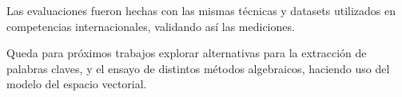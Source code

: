 \documentclass{llncs}
\begin{document}
Las evaluaciones fueron hechas con las mismas técnicas y datasets utilizados en competencias internacionales, validando así las mediciones.

Queda para próximos trabajos explorar alternativas para la extracción de palabras claves, y el ensayo de distintos métodos algebraicos, haciendo uso del modelo del espacio vectorial.


{}

\end{document}
